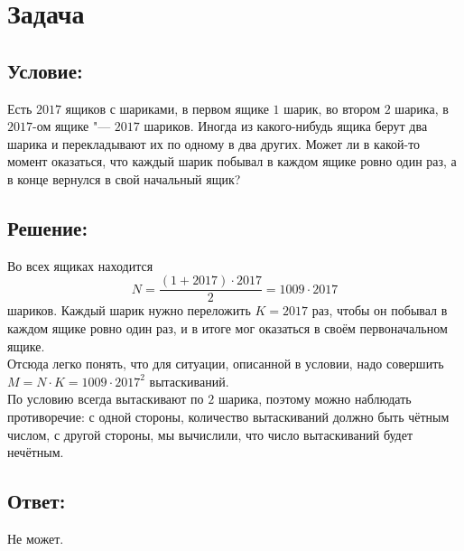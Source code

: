 \section{Задача}

\subsection*{Условие:}
Есть $2017$ ящиков с шариками, в первом ящике $1$ шарик, во втором $2$ шарика, в $2017$-ом ящике
"--- $2017$ шариков. Иногда из какого-нибудь ящика берут два шарика и перекладывают их по одному в
два других. Может ли в какой-то момент оказаться, что каждый шарик побывал в каждом ящике ровно
один раз, а в конце вернулся в свой начальный ящик?

\subsection*{Решение:}
Во всех ящиках находится
$$
    N = \dfrac{(1 + 2017)\cdot2017}{2} = 1009\cdot2017
$$
\noindent шариков. Каждый шарик нужно переложить $K = 2017$ раз, чтобы он побывал в каждом ящике
ровно один раз, и в итоге мог оказаться в своём первоначальном ящике.\\

Отсюда легко понять, что для ситуации, описанной в условии, надо совершить
$M = N \cdot K = 1009 \cdot 2017^2$ вытаскиваний.\\

По условию всегда вытаскивают по $2$ шарика, поэтому можно наблюдать противоречие: с одной стороны,
количество вытаскиваний должно быть чётным числом, с другой стороны, мы вычислили, что число
вытаскиваний будет нечётным.

\subsection*{Ответ:}
Не может.